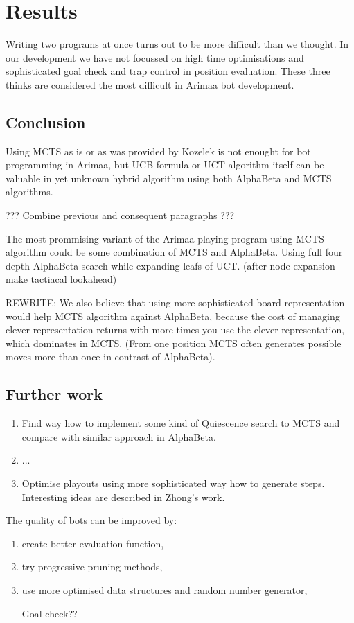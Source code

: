 
\chapter{Results}
Writing two programs at once turns out to be more difficult than we thought. In
our development we have not focussed on high time optimisations and
sophisticated goal check and trap control in position evaluation. These three
thinks are considered the most difficult in Arimaa bot development.

\section{Conclusion}
Using MCTS as is or as was provided by Kozelek is not enought for bot
programming in Arimaa, but UCB formula or UCT algorithm itself can be valuable
in yet unknown hybrid algorithm using both AlphaBeta and MCTS algorithms.

??? Combine previous and consequent paragraphs ???

The most prommising variant of the Arimaa playing program using MCTS algorithm
could be some combination of MCTS and AlphaBeta. Using full four depth
AlphaBeta search while expanding leafs of UCT. (after node expansion make
tactiacal lookahead)

REWRITE: We also believe that using more sophisticated board representation
would help MCTS algorithm against AlphaBeta, because the cost of managing
clever representation returns with more times you use the clever
representation, which dominates in MCTS. (From one position MCTS often
generates possible moves more than once in contrast of AlphaBeta).

\section{Further work}

\begin{enumerate}
\item Find way how to implement some kind of Quiescence search to MCTS and compare with similar approach in AlphaBeta.
\item ...
\item Optimise playouts using more sophisticated way how to generate steps. Interesting ideas are described in Zhong's work.\cite{ZHONG}
\end{enumerate}

The quality of bots can be improved by:
\begin{enumerate}
\item create better evaluation function,
\item try progressive pruning methods\cite{progressive-strategies},
\item use more optimised data structures and random number generator,

Goal check??

\end{enumerate}
